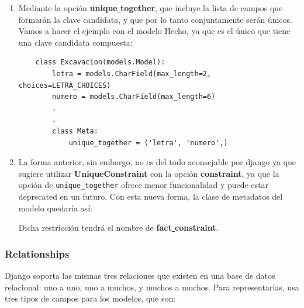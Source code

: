     \begin{enumerate}
        \item Mediante la opción \textbf{unique\underline{ }together}, que incluye la lista
        de campos que formarán la clave candidata, y que por lo tanto conjuntamente serán
        únicos. Vamos a hacer el ejemplo con el modelo Hecho, ya que es el único que tiene
        una clave candidata compuesta:
        
    \begin{verbatim}
    class Excavacion(models.Model):
        letra = models.CharField(max_length=2, choices=LETRA_CHOICES)
        numero = models.CharField(max_length=6)    
        .
        .
        class Meta:
            unique_together = ('letra', 'numero',)
    \end{verbatim}

        \item La forma anterior, sin embargo, no es del todo aconsejable por django ya
        que sugiere utilizar \textbf{UniqueConstraint} con la opción \textbf{constraint},
        ya que la opción de \verb|unique_together| ofrece menor funcionalidad y puede
        estar deprecated en un futuro. Con esta nueva forma, la clase de metadatos
        del modelo quedaría así:
        
    Dicha restricción tendrá el nombre de \textbf{fact\underline{ }constraint}.
    \end{enumerate}

    \subsubsection{Relationships}
    Django soporta las mismas tres relaciones que existen en una base de datos relacional:
    uno a uno, uno a muchos, y muchos a muchos. Para representarlas, usa tres tipos de campos
    para los modelos, que son:

